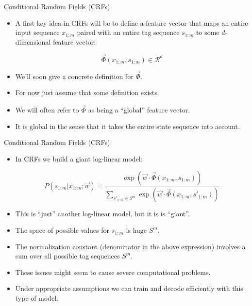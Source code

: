 \documentclass[handout]{beamer}
\begin{document}
\begin{frame}{Conditional Random Fields (CRFs)}
\begin{scriptsize}

\begin{itemize}

\item A first key idea in CRFs will be to define a feature vector  that maps an entire input sequence $x_{1:m}$ paired with an entire tag sequence $s_{1:m}$ to some $d$-dimensional feature vector:

\begin{displaymath}
 \vec{\Phi}(x_{1:m},s_{1:m}) \in \mathcal{R}^d
\end{displaymath}

\item We'll soon give a concrete definition for $\vec{\Phi}$.
\item  For now just assume that some definition exists. 
\item We will often refer to $\vec{\Phi}$ as being a ``global'' feature vector.
\item It is global in the sense that it takes the entire state
sequence into account.

\end{itemize}

\end{scriptsize}
\end{frame}



\begin{frame}{Conditional Random Fields (CRFs)}
\begin{scriptsize}

\begin{itemize}

\item In CRFs we build a giant log-linear model:

\begin{displaymath}
 P(s_{1:m}|x_{1:m}; \vec{w}) = \frac{\exp (\vec{w} \cdot \vec{\Phi}(x_{1:m},s_{1:m}))}{\sum_{s'_{1:m} \in S^m}\exp (\vec{w} \cdot \vec{\Phi}(x_{1:m},s'_{1:m}))}
\end{displaymath}

\item This is ``just'' another log-linear model, but it is is ``giant''.
\item The space of possible values for $s_{1:m}$ is huge $S^m$. 
\item The normalization constant (denominator in the above expression) involves a sum over all possible tag sequences $S^m$.
\item These issues might seem to cause severe computational problems.
\item  Under appropriate assumptions we can train and decode efficiently
with this type of model.
\end{itemize}

\end{scriptsize}
\end{frame}
\end{document}
